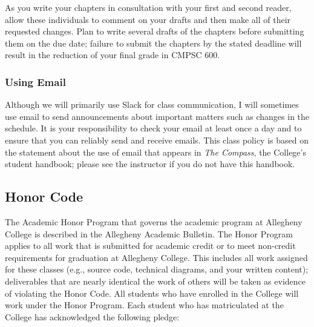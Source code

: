 As you write your chapters in consultation with your first and second reader, allow these individuals to comment on your
drafts and then make all of their requested changes.  Plan to write several drafts of the chapters before submitting them
on the due date; failure to submit the chapters by the stated deadline will result in the reduction of your final grade
in CMPSC 600.



\vspace*{-.15in}
\subsubsection*{Using Email}
\vspace*{-.05in}

Although we will primarily use Slack for class communication, I will sometimes use email to send announcements about
important matters such as changes in the schedule. It is your responsibility to check your email at least once a day and to
ensure that you can reliably send and receive emails. This class policy is based on the statement about the use of email that
appears in {\em The Compass}, the College's student handbook; please see the instructor if you do not have this
handbook.

\vspace*{-.15in}
\subsection*{Honor Code}
\vspace*{-.05in}

The Academic Honor Program that governs the academic program at Allegheny College is described in the Allegheny
Academic Bulletin.  The Honor Program applies to all work that is submitted for academic credit or to meet non-credit
requirements for graduation at Allegheny College.  This includes all work assigned for these classes (e.g., source code,
technical diagrams, and your written content); deliverables that are nearly identical the work of others will be taken
as evidence of violating the Honor Code. All students who have enrolled in the College will work under the Honor
Program.  Each student who has matriculated at the College has acknowledged the following pledge:

